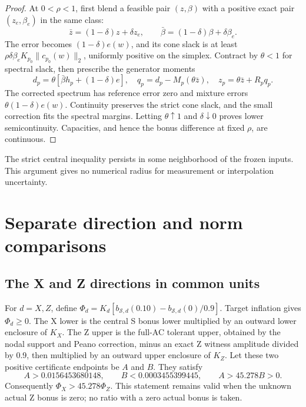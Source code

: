 \documentclass[9pt]{osa-supplemental-document}
\begin{document}
\begin{proof}
At $0<\rho<1$, first blend a feasible pair $(z,\beta)$ with a positive exact pair $(z_e,\beta_e)$ in the same class:
\begin{equation}
 \bar z=(1-\delta)z+\delta z_e,\qquad
 \bar\beta=(1-\delta)\beta+\delta\beta_e.
\end{equation}
The error becomes $(1-\delta)e(w)$, and its cone slack is at least $\rho\delta\beta_eK_{p_0}\|c_{p_0}(w)\|_2$, uniformly positive on the simplex. Contract by $\theta<1$ for spectral slack, then prescribe the generator moments
\begin{equation}
 d_p=\theta[\bar\beta h_p+(1-\delta)e],\quad
 q_p=d_p-M_p(\theta\bar z),\quad
 z_p=\theta\bar z+R_pq_p.
\end{equation}
The corrected spectrum has reference error zero and mixture errors $\theta(1-\delta)e(w)$. Continuity preserves the strict cone slack, and the small correction fits the spectral margins. Letting $\theta\uparrow1$ and $\delta\downarrow0$ proves lower semicontinuity. Capacities, and hence the bonus difference at fixed $\rho$, are continuous. \end{proof}
The strict central inequality persists in some neighborhood of the frozen inputs. This argument gives no numerical radius for measurement or interpolation uncertainty.

\section{Separate direction and norm comparisons}
\subsection{The X and Z directions in common units}
For $d=X,Z$, define $\Phi_d=K_d[b_{\mathcal S,d}(0.10)-b_{\mathcal S,d}(0)/0.9]$. Target inflation gives $\Phi_d\geq0$. The X lower is the central S bonus lower multiplied by an outward lower enclosure of $K_X$. The Z upper is the full-AC tolerant upper, obtained by the nodal support and Peano correction, minus an exact Z witness amplitude divided by 0.9, then multiplied by an outward upper enclosure of $K_Z$. Let these two positive certificate endpoints be $A$ and $B$. They satisfy
\begin{equation}
 A>0.0156453680148,\qquad B<0.0003455399445,\qquad A>45.278B>0.
\end{equation}
Consequently $\Phi_X>45.278\Phi_Z$. This statement remains valid when the unknown actual Z bonus is zero; no ratio with a zero actual bonus is taken.
\end{document}
